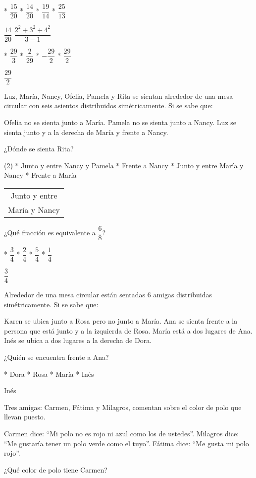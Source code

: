 \begin{task}
	* $\dfrac{15}{20}$
	* $\dfrac{14}{20}$
	* $\dfrac{19}{14}$
	* $\dfrac{25}{13}$
\end{task}
$\dfrac{14}{20}$
$\dfrac{2^2+3^2+4^2}{3-1}$
\begin{enum}
	* $\dfrac{29}{3}$
	* $\dfrac{2}{29}$
	* $-\dfrac{29}{2}$
	* $\dfrac{29}{2}$
\end{enum}
$\dfrac{29}{2}$
\begin{mini}[.8]
	Luz, Mar\'ia, Nancy, Ofelia, Pamela y Rita se sientan alrededor de una mesa circular con seis asientos distribuidos sim\'etricamente. Si se sabe que:
	\begin{itemize}
		\ii Ofelia no se sienta junto a Mar\'ia.
		\ii Pamela no se sienta junto a Nancy.
		\ii Luz se sienta junto y a la derecha de Mar\'ia y frente a Nancy.
	\end{itemize}
	¿D\'onde se sienta Rita?
\end{mini}
\begin{mini}[.9]
	\begin{enum}(2)
		* Junto y entre Nancy y Pamela
		* Frente a Nancy
		* Junto y entre Mar\'ia y Nancy
		* Frente a Mar\'ia
	\end{enum}
\end{mini}
\begin{tabular}{c}
	Junto y entre \\
	Mar\'ia y Nancy
\end{tabular}
¿Qu\'e fracci\'on es equivalente a $\dfrac{6}{8}$?
\begin{task}
	* $\dfrac{3}{4}$
	* $\dfrac{2}{4}$
	* $\dfrac{5}{4}$
	* $\dfrac{1}{4}$
\end{task}
$\dfrac{3}{4}$
\begin{mini}[.8]
	Alrededor de una mesa circular est\'an sentadas $6$ amigas distribuidas sim\'etricamente. Si se sabe que:
	\begin{itemize}
		\ii Karen se ubica junto a Rosa pero no junto a Mar\'ia.
		\ii Ana se sienta frente a la persona que est\'a junto y a la izquierda de Rosa.
		\ii Mar\'ia est\'a a dos lugares de Ana.
		\ii In\'es se ubica a dos lugares a la derecha de Dora.
	\end{itemize}
	¿Qui\'en se encuentra frente a Ana?
\end{mini}
\begin{task}
	* Dora
	* Rosa
	* Mar\'ia
	* In\'es
\end{task}
In\'es
\begin{mini}[.8]
	Tres amigas: Carmen, F\'atima y Milagros, comentan sobre el color de polo que llevan puesto.
	\begin{itemize}
		\ii Carmen dice: ``Mi polo no es rojo ni azul como los de ustedes''.
		\ii Milagros dice: ``Me gustar\'ia tener un polo verde como el tuyo''.
		\ii F\'atima dice: ``Me gusta mi polo rojo''.
	\end{itemize}
	¿Qu\'e color de polo tiene Carmen?
\end{mini}
